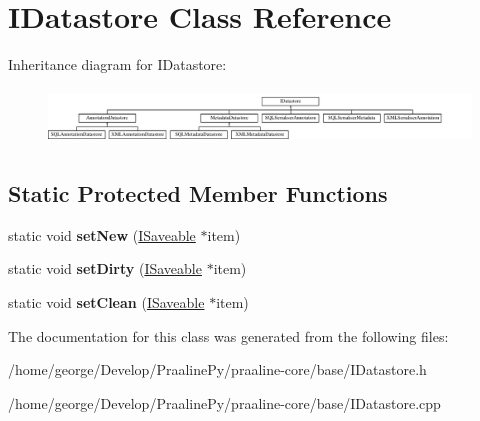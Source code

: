 \hypertarget{class_i_datastore}{}\section{I\+Datastore Class Reference}
\label{class_i_datastore}
Inheritance diagram for I\+Datastore\+:\begin{figure}[H]
\begin{center}
\leavevmode
\includegraphics[height=1.490683cm]{class_i_datastore}
\end{center}
\end{figure}
\subsection*{Static Protected Member Functions}
\begin{DoxyCompactItemize}
\item 
\mbox{\label{class_i_datastore_a32e75a751d810a5330ae8c3ec4dbd09c}} 
static void {\bfseries set\+New} (\hyperlink{class_i_saveable}{I\+Saveable} $\ast$item)
\item 
\mbox{\label{class_i_datastore_af97d7e04ec4844f287e903f640716e6f}} 
static void {\bfseries set\+Dirty} (\hyperlink{class_i_saveable}{I\+Saveable} $\ast$item)
\item 
\mbox{\label{class_i_datastore_a520f8a87495a0c7486100a5cbc792b4c}} 
static void {\bfseries set\+Clean} (\hyperlink{class_i_saveable}{I\+Saveable} $\ast$item)
\end{DoxyCompactItemize}


The documentation for this class was generated from the following files\+:\begin{DoxyCompactItemize}
\item 
/home/george/\+Develop/\+Praaline\+Py/praaline-\/core/base/I\+Datastore.\+h\item 
/home/george/\+Develop/\+Praaline\+Py/praaline-\/core/base/I\+Datastore.\+cpp\end{DoxyCompactItemize}
